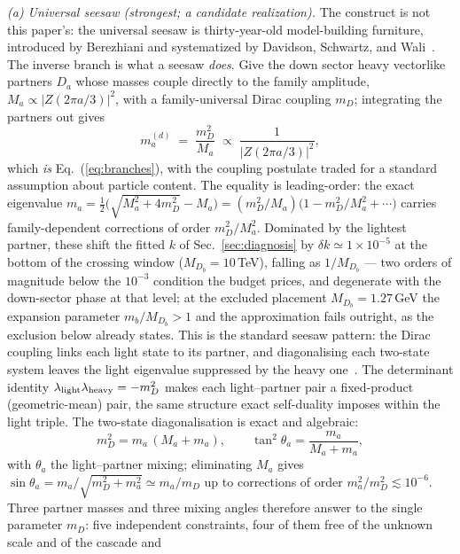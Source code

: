\documentclass[11pt]{article}
\begin{document}
\emph{(a) Universal seesaw (strongest; a candidate realization).} The
construct is not this paper's: the universal seesaw is thirty-year-old
model-building furniture, introduced by Berezhiani and systematized by
Davidson, Schwartz, and Wali~\cite{Berezhiani,DavidsonWali,DSW,DSV}. The
inverse branch is what a seesaw \emph{does}. Give the down sector heavy vectorlike
partners $D_a$ whose masses couple directly to the family amplitude,
$M_a \propto |Z(2\pi a/3)|^2$, with a family-universal Dirac coupling $m_D$;
integrating the partners out gives
\begin{equation}
m_a^{(d)} \;=\; \frac{m_D^2}{M_a} \;\propto\; \frac{1}{|Z(2\pi a/3)|^2},
\label{eq:seesaw}
\end{equation}
which \emph{is} Eq.~(\ref{eq:branches}), with the coupling postulate traded for a standard assumption about particle content. The equality is leading-order: the exact eigenvalue
$m_a = \tfrac{1}{2}\bigl(\sqrt{M_a^2+4m_D^2}-M_a\bigr) = (m_D^2/M_a)\bigl(1 - m_D^2/M_a^2 + \cdots\bigr)$
carries family-dependent corrections of order $m_D^2/M_a^2$. Dominated by the
lightest partner, these shift the fitted $k$ of Sec.~\ref{sec:diagnosis} by
$\delta k \simeq 1\times10^{-5}$ at the bottom of the crossing window
($M_{D_b} = 10$\,TeV), falling as $1/M_{D_b}$ --- two orders of
magnitude below the $10^{-3}$ condition the budget prices, and degenerate
with the down-sector phase at that level; at the excluded placement
$M_{D_b} = 1.27$\,GeV the expansion parameter $m_b/M_{D_b} > 1$ and the
approximation fails outright, as the exclusion below already states. This is the standard seesaw pattern: the Dirac coupling links each light state to its partner, and diagonalising each two-state system leaves the light eigenvalue suppressed by the heavy one~\cite{Berezhiani,DavidsonWali}. The determinant identity $\lambda_{\rm light}\lambda_{\rm heavy} = -m_D^2$ makes each light--partner pair
a fixed-product (geometric-mean) pair, the same structure exact self-duality imposes within the light triple. The two-state diagonalisation is exact and algebraic:
\begin{equation}
m_D^2 = m_a\,(M_a+m_a), \qquad \tan^2\theta_a = \frac{m_a}{M_a+m_a},
\label{eq:double}
\end{equation}
with $\theta_a$ the light--partner mixing; eliminating $M_a$ gives
$\sin\theta_a = m_a/\sqrt{m_D^2+m_a^2} \simeq m_a/m_D$ up to corrections of
order $m_a^2/m_D^2 \lesssim 10^{-6}$. Three partner masses and three mixing
angles therefore answer to the single parameter $m_D$: five independent
constraints, four of them free of the unknown scale and of the cascade and
\end{document}
